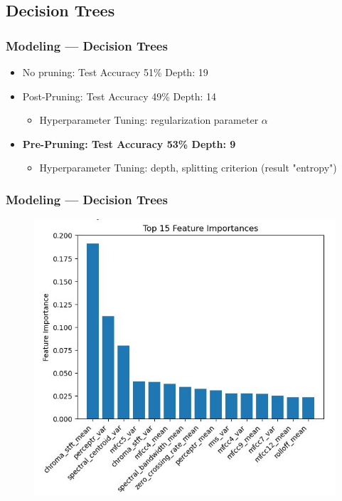 \documentclass[10pt, aspectratio=169]{beamer}
\begin{document}
\subsection{Decision Trees}
\begin{frame}
    \frametitle{Modeling --- Decision Trees}
    \begin{itemize}\setlength\itemsep{12pt}
        \item No pruning: Test Accuracy 51\%  \quad Depth: 19
        \item Post-Pruning: Test Accuracy 49\% \quad Depth: 14 \begin{itemize}
            \item Hyperparameter Tuning: regularization parameter $\alpha$
        \end{itemize}
        \item \textbf{Pre-Pruning: Test Accuracy 53\% \quad Depth: 9}\begin{itemize}
            \item Hyperparameter Tuning: depth, splitting criterion (result "entropy")
        \end{itemize}
    \end{itemize}
\end{frame}

\begin{frame}
    \frametitle{Modeling --- Decision Trees}
    \begin{figure}
        \centering
        \includegraphics[width=0.6\linewidth]{img/DTFeatureImportance.jpg}
    \end{figure}
\end{frame}
\end{document}
